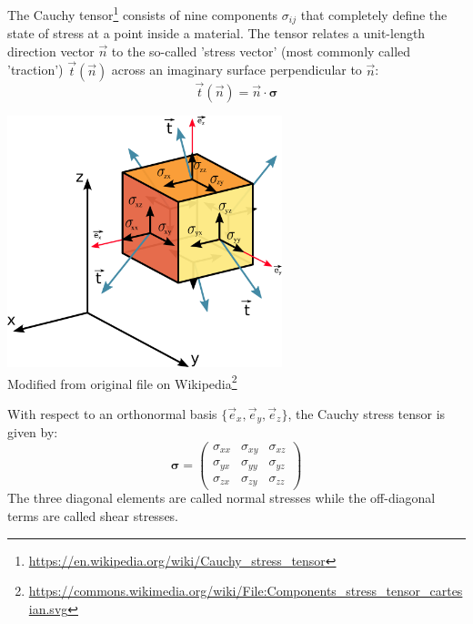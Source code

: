 The Cauchy tensor\footnote{\url{https://en.wikipedia.org/wiki/Cauchy_stress_tensor}} 
consists of nine components $\sigma_{ij}$  that completely define the state of stress 
at a point inside a material. 
The tensor relates a unit-length direction vector $\vec{n}$ to the so-called 'stress vector' (most commonly called 'traction') $\vec{t}(\vec{n})$ across an imaginary surface perpendicular to $\vec{n}$:
\[
\vec{t}(\vec n)= {\vec n} \cdot {\bm \sigma}
\]

\begin{center}
\includegraphics[width=8cm]{images/contmech/Components_stress_tensor_cartesian}\\
{\scriptsize Modified from original 
file on Wikipedia\footnote{\url{https://commons.wikimedia.org/wiki/File:Components_stress_tensor_cartesian.svg}}}
\end{center}

With respect to an orthonormal basis $\{\vec{e}_x,\vec{e}_y,\vec{e}_z\}$, the Cauchy stress tensor
is given by:
\begin{equation}
{\bm \sigma}=
\left(
\begin{array}{ccc}
\sigma_{xx} & \sigma_{xy} & \sigma_{xz} \\
\sigma_{yx} & \sigma_{yy} & \sigma_{yz} \\
\sigma_{zx} & \sigma_{zy} & \sigma_{zz} 
\end{array}
\right)
\end{equation}
The three diagonal elements are called normal stresses while the off-diagonal terms 
are called shear stresses.

